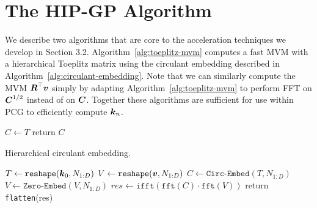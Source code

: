 \onecolumn
{}

\section{The HIP-GP Algorithm}

We describe two algorithms that are core to the  acceleration techniques we develop in Section 3.2. 
Algorithm~\ref{alg:toeplitz-mvm} computes a fast MVM
with a hierarchical Toeplitz matrix using the circulant embedding
described in Algorithm~\ref{alg:circulant-embedding}. 
Note that we can similarly compute the MVM $\boldsymbol{R}^\top \boldsymbol{v}$ simply by adapting Algorithm~\ref{alg:toeplitz-mvm} to perform FFT on $\boldsymbol{C}^{1/2}$ instead of on $\boldsymbol{C}$. Together these algorithms are sufficient for use within PCG to efficiently compute $\boldsymbol{k}_n$.

\begin{algorithm}[!h]
  $C \leftarrow T$ 
  return $C$
\caption{Hierarchical circulant embedding.}
\label{alg:circulant-embedding}
\end{algorithm}

\begin{algorithm}[!h]
  $T \leftarrow \texttt{reshape}(\boldsymbol{k}_0, N_{1:D})$ 
  $V \leftarrow \texttt{reshape}(\boldsymbol{v}, N_{1:D})$ 
  $C \leftarrow \texttt{Circ-Embed}(T, N_{1:D})$ \tcp*{} %
  $V \leftarrow \texttt{Zero-Embed}(V, N_{1:D})$ 
  $res \leftarrow \texttt{ifft}( \texttt{fft}(C) \cdot \texttt{fft}(V) )$ 
  return \texttt{flatten}(res) 
\caption{Matrix-vector multiplication $\bK \bv$ for a symmetric
  hierarchical Toeplitz matrix $\bK$ and vector $\bv$.
}
\label{alg:toeplitz-mvm}
\end{algorithm}




